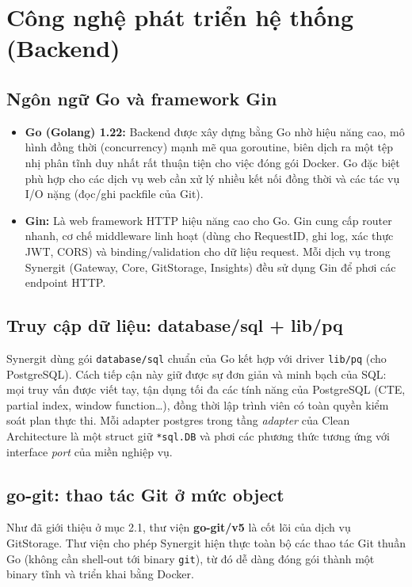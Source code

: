 \section{Công nghệ phát triển hệ thống (Backend)}

\subsection{Ngôn ngữ Go và framework Gin}
\begin{itemize}
\item \textbf{Go (Golang) 1.22:} Backend được xây dựng bằng Go nhờ hiệu năng cao, mô hình đồng thời (concurrency) mạnh mẽ qua goroutine, biên dịch ra một tệp nhị phân tĩnh duy nhất rất thuận tiện cho việc đóng gói Docker. Go đặc biệt phù hợp cho các dịch vụ web cần xử lý nhiều kết nối đồng thời và các tác vụ I/O nặng (đọc/ghi packfile của Git).
\item \textbf{Gin:} Là web framework HTTP hiệu năng cao cho Go. Gin cung cấp router nhanh, cơ chế middleware linh hoạt (dùng cho RequestID, ghi log, xác thực JWT, CORS) và binding/validation cho dữ liệu request. Mỗi dịch vụ trong Synergit (Gateway, Core, GitStorage, Insights) đều sử dụng Gin để phơi các endpoint HTTP.
\end{itemize}

\subsection{Truy cập dữ liệu: database/sql + lib/pq}
Synergit dùng gói \texttt{database/sql} chuẩn của Go kết hợp với driver \texttt{lib/pq} (cho PostgreSQL). Cách tiếp cận này giữ được sự đơn giản và minh bạch của SQL: mọi truy vấn được viết tay, tận dụng tối đa các tính năng của PostgreSQL (CTE, partial index, window function\ldots), đồng thời lập trình viên có toàn quyền kiểm soát plan thực thi. Mỗi adapter postgres trong tầng \textit{adapter} của Clean Architecture là một struct giữ \texttt{*sql.DB} và phơi các phương thức tương ứng với interface \textit{port} của miền nghiệp vụ.

\subsection{go-git: thao tác Git ở mức object}
Như đã giới thiệu ở mục 2.1, thư viện \textbf{go-git/v5} là cốt lõi của dịch vụ GitStorage. Thư viện cho phép Synergit hiện thực toàn bộ các thao tác Git thuần Go (không cần shell-out tới binary \texttt{git}), từ đó dễ dàng đóng gói thành một binary tĩnh và triển khai bằng Docker.

